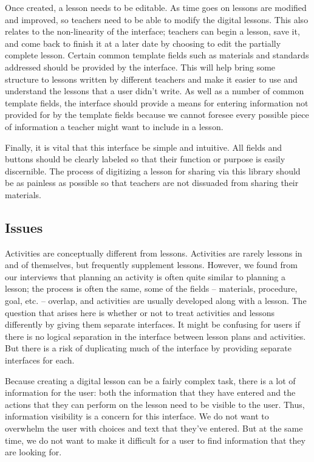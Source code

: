 \documentclass[10pt,letter]{article}
\begin{document}
Once created, a lesson needs to be editable. As time goes on lessons are
modified and improved, so teachers need to be able to modify the digital
lessons. This also relates to the non-linearity of the interface; teachers can
begin a lesson, save it, and come back to finish it at a later date by choosing
to edit the partially complete lesson. Certain common template fields such as
materials and standards addressed should be provided by the interface. This will
help bring some structure to lessons written by different teachers and make it
easier to use and understand the lessons that a user didn't write. As well as
a number of common template fields, the interface should provide a means for
entering information not provided for by the template fields because we cannot
foresee every possible piece of information a teacher might want to include in a
lesson.

Finally, it is vital that this interface be simple and intuitive. All fields and
buttons should be clearly labeled so that their function or purpose is easily
discernible. The process of digitizing a lesson for sharing via this library
should be as painless as possible so that teachers are not dissuaded from
sharing their materials.

\subsection{Issues}
\label{sec: issues}
Activities are conceptually different from lessons. Activities are rarely
lessons in and of themselves, but frequently supplement lessons. However,
we found from our interviews that planning an activity is often quite similar to
planning a lesson; the process is often the same, some of the fields --
materials, procedure, goal, etc. -- overlap, and activities are usually
developed along with a lesson. The question that arises here is whether or not
to treat activities and lessons differently by giving them separate interfaces.
It might be confusing for users if there is no logical separation in the
interface between lesson plans and activities. But there is a risk of
duplicating much of the interface by providing separate interfaces for each.

Because creating a digital lesson can be a fairly complex task, there is a lot
of information for the user: both the information that they have entered and the
actions that they can perform on the lesson need to be visible to the user.
Thus, information visibility is a concern for this interface. We do not want to
overwhelm the user with choices and text that they've entered. But at the same
time, we do not want to make it difficult for a user to find information that
they are looking for.
\end{document}
